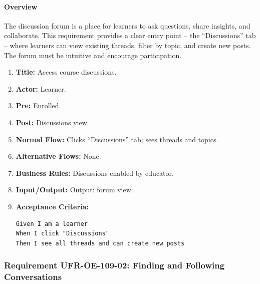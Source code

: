 \paragraph{Overview}
The discussion forum is a place for learners to ask questions, share insights, and collaborate. This requirement provides a clear entry point – the “Discussions” tab – where learners can view existing threads, filter by topic, and create new posts. The forum must be intuitive and encourage participation.
\begin{enumerate}[label=\textbf{\arabic*.}]
\item \textbf{Title:} Access course discussions.
\item \textbf{Actor:} Learner.
\item \textbf{Pre:} Enrolled.
\item \textbf{Post:} Discussions view.
\item \textbf{Normal Flow:} Clicks “Discussions” tab; sees threads and topics.
\item \textbf{Alternative Flows:} None.
\item \textbf{Business Rules:} Discussions enabled by educator.
\item \textbf{Input/Output:} Output: forum view.
\item \textbf{Acceptance Criteria:}
    \begin{verbatim}
Given I am a learner
When I click "Discussions"
Then I see all threads and can create new posts
    \end{verbatim}
\end{enumerate}

\subsubsection{Requirement UFR-OE-109-02: Finding and Following Conversations}
